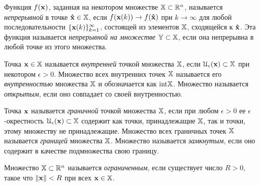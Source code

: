     Функция $f(\mathbf{x})$, заданная на некотором множестве
    $\mathbb{X}\subset\mathbb{R}^{n}$, называется \emph{непрерывной} в точке
    $\mathbf{\hat{x}}\in\mathbb{X}$, если $f(\mathbf{x}(k))\rightarrow f(\mathbf{\hat{x}})$
    при $k\rightarrow\infty$ для любой последовательности
    $\{\mathbf{x}(k)\}_{k=1}^{\infty}$, состоящей из элементов $\mathbb{X}$,
    сходящейся к $\mathbf{\hat{x}}$. Эта функция называется \emph{непрерывной
    на множестве} $\mathbb{Y}\subset\mathbb{X}$, если она непрерывна в любой
    точке из этого множества.


    Точка $\mathbf{x}\in\mathbb{X}$ называется \emph{внутренней} точкой множества
    $\mathbb{X}$, если $\mathcal{U}_{\epsilon}(\mathbf{x})\subset\mathbb{X}$ при
    некотором $\epsilon>0$. Множество всех внутренних точек
    $\mathbb{X}$ называется его \emph{внутренностью} множества $\mathbb{X}$ и обозначается
    как $\text{int}\mathbb{X}$. Множество называется \emph{открытым}, если оно
    совпадает со своей внутренностью.


    Точка $\mathbf{x}$ называется \emph{граничной} точкой множества
    $\mathbb{X}$, если при любом $\epsilon>0$ ее $\epsilon$-окрестность
    $\mathcal{U}_{\epsilon}(\mathbf{x})\subset\mathbb{X}$ содержит как
    точки, принадлежащие $\mathbb{X}$, так и точки, этому множеству не
    принадлежащие. Множество всех граничных точек $\mathbb{X}$
    называется \emph{границей} множества $\mathbb{X}$. Множество называется
    \emph{замкнутым}, если оно содержит в качестве подмножества свою
    границу.

    Множество $\mathbb{X}\subset\mathbb{R}^{n}$ называется \emph{ограниченным}, если
    существует число $R>0$, такое что $\|\mathbf{x}\|<R$ при всех
    $\mathbf{x}\in\mathbb{X}$.



